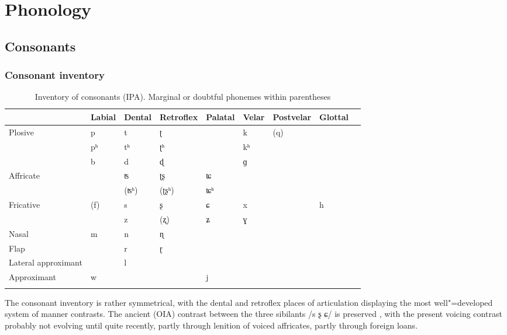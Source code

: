\chapter{Phonology}
\label{chap:3}

\section{Consonants}
\label{sec:3-1}

\subsection{Consonant inventory}
\label{subsec:3-1-0}

\begin{table}[ht]
\caption{Inventory of consonants (IPA). Marginal or doubtful phonemes within parentheses}
\begin{tabularx}{\textwidth}{ P{20mm} Q Q Q Q Q Q Q Q }
\lsptoprule
&
La\-bi\-al &
Den\-tal &
Retro\-flex &
Pa\-la\-tal &
Ve\-lar &
Post\-velar &
Glot\-tal \\\hline
Plo\-sive
&
p &
t &
ʈ &
&
k &
(q) &
\\
&
pʰ &
tʰ &
ʈʰ &
&
kʰ &
&
\\
&
b &
d &
ɖ &
&
ɡ &
&
\\
Affricate
&
&
ʦ &
ʈʂ &
ʨ &
&
&
\\
&
&
(ʦʰ) &
(ʈʂʰ) &
ʨʰ &
&
&
\\
Fricative
&
(f) &
s &
ʂ &
ɕ &
x &
&
h\\
&
&
z &
(ʐ) &
ʑ &
ɣ &
&
\\
Nasal
&
m &
n &
ɳ &
&
&
&
\\
Flap
&
&
r &
ɽ &
&
&
&
\\
Lateral approximant
&
&
l &
&
&
&
&
\\
Approximant
&
w &
&
&
j &
&
&
\\\lspbottomrule
\end{tabularx}
\label{tab:3-1}
\end{table}

The consonant inventory is rather symmetrical, with the dental and retroflex places of articulation displaying the most well"=developed system of manner contrasts. The ancient (OIA) contrast between the three sibilants /s ʂ ɕ/ is preserved \citep[375]{cardonaluraghi2009}, with the present voicing contrast probably not evolving until quite recently, partly through lenition of voiced affricates, partly through foreign loans. 

